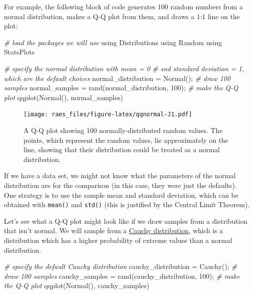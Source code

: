\documentclass[
  11pt,
]{book}
\newenvironment{Shaded}{\begin{snugshade}}{\end{snugshade}}
\newcommand{\CommentTok}[1]{\textcolor[rgb]{0.37,0.37,0.37}{\textit{#1}}}
\newcommand{\FloatTok}[1]{\textcolor[rgb]{0.06,0.06,0.06}{#1}}
\newcommand{\NormalTok}[1]{#1}
\begin{document}
For example, the following block of code generates 100 random numbers from a normal distribution, makes a Q-Q plot from them, and draws a 1:1 line on the plot:

\begin{Shaded}
\begin{Highlighting}[]
\CommentTok{# load the packages we will use}
\NormalTok{using Distributions}
\NormalTok{using Random}
\NormalTok{using StatsPlots}

\CommentTok{# specify the normal distribution with mean = 0 }
\CommentTok{# snd standard deviation = 1, which are the default choices}
\NormalTok{normal_distribution = Normal();}
\CommentTok{# draw 100 samples}
\NormalTok{normal_samples = rand(normal_distribution, }\FloatTok{100}\NormalTok{);}
\CommentTok{# make the Q-Q plot}
\NormalTok{qqplot(Normal(), normal_samples) }
\end{Highlighting}
\end{Shaded}

\begin{figure}
\centering
\texttt{[image: raes\_files/figure-latex/qqnormal-J1.pdf]}
\caption{\label{fig:qqnormal}A Q-Q plot showing 100 normally-distributed random values. The points, which represent the random values, lie approximately on the line, showing that their distribution could be treated as a normal distribution.}
\end{figure}

If we have a data set, we might not know what the parameters of the normal distribution are for the comparison (in this case, they were just the defaults). One strategy is to use the sample mean and standard deviation, which can be obtained with \texttt{mean()} and \texttt{std()} (this is justified by the Central Limit Theorem).

Let's see what a Q-Q plot might look like if we draw samples from a distribution that isn't normal. We will sample from a \href{https://en.wikipedia.org/wiki/Cauchy_distribution}{Cauchy distribution}, which is a distribution which has a higher probability of extreme values than a normal distribution.

\begin{Shaded}
\begin{Highlighting}[]
\CommentTok{# specify the default Cauchy distribution }
\NormalTok{cauchy_distribution = Cauchy();}
\CommentTok{# draw 100 samples}
\NormalTok{cauchy_samples = rand(cauchy_distribution, }\FloatTok{100}\NormalTok{);}
\CommentTok{# make the Q-Q plot}
\NormalTok{qqplot(Normal(), cauchy_samples) }
\end{Highlighting}
\end{Shaded}
\end{document}
